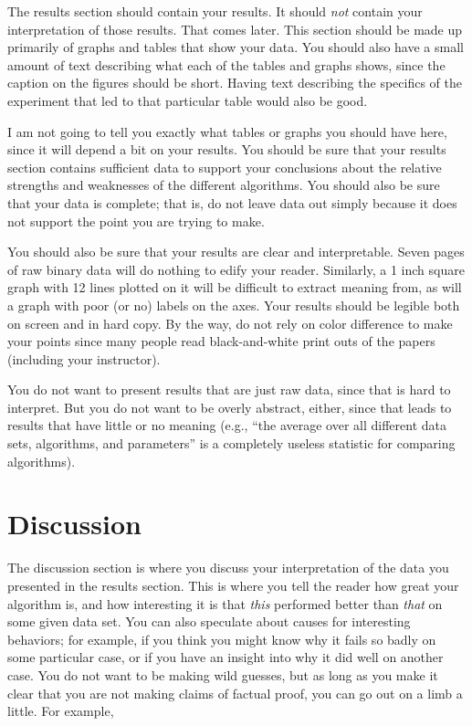 \documentclass[12pt,letterpaper]{article}
\begin{document}
The results section should contain your results.  It should \emph{not} contain
your interpretation of those results.  That comes later.  This section should be
made up primarily of graphs and tables that show your data.  You should also
have a small amount of text describing what each of the tables and graphs shows,
since the caption on the figures should be short.  Having text describing the
specifics of the experiment that led to that particular table would also be
good.  

I am not going to tell you exactly what tables or graphs you should have here,
since it will depend a bit on your results.  You should be sure that your
results section contains sufficient data to support your conclusions about the
relative strengths and weaknesses of the different algorithms.  You should also
be sure that your data is complete; that is, do not leave data out simply because
it does not support the point you are trying to make.

You should also be sure that your results are clear and interpretable.  Seven
pages of raw binary data will do nothing to edify your reader.  Similarly, a
1 inch square graph with 12 lines plotted on it will be difficult to extract
meaning from, as will a graph with poor (or no) labels on the axes.  Your
results should be legible both on screen and in hard copy. By the way, do
not rely on color difference to make your points since many people read
black-and-white print outs of the papers (including your instructor).

You do not want to present results that are just raw data, since that is hard to
interpret.  But you do not want to be overly abstract, either, since that leads to
results that have little or no meaning (e.g., ``the average over all different
data sets, algorithms, and parameters'' is a completely useless statistic for
comparing algorithms).

\section{Discussion}
The discussion section is where you discuss your interpretation of the data you
presented in the results section.  This is where you tell the reader how great
your algorithm is, and how interesting it is that \emph{this} performed better
than \emph{that} on some given data set.  You can also speculate about causes
for interesting behaviors; for example, if you think you might know why it fails
so badly on some particular case, or if you have an insight into why it did well
on another case.  You do not want to be making wild guesses, but as long as you
make it clear that you are not making claims of factual proof, you can go out on
a limb a little.  For example,
\end{document}
